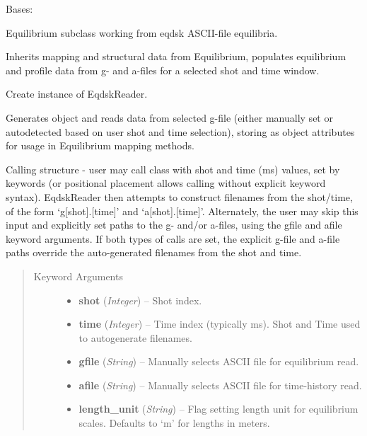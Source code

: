 \documentclass[letterpaper,10pt,english]{sphinxmanual}
\begin{document}
\begin{fulllineitems}
\label{eqtools:eqtools.eqdskreader.EqdskReader}
Bases: {\hyperref[eqtools:eqtools.core.Equilibrium]{}}

Equilibrium subclass working from eqdsk ASCII-file equilibria.

Inherits mapping and structural data from Equilibrium, populates equilibrium
and profile data from g- and a-files for a selected shot and time window.

Create instance of EqdskReader.

Generates object and reads data from selected g-file (either manually set or
autodetected based on user shot and time selection), storing as object
attributes for usage in Equilibrium mapping methods.

Calling structure - user may call class with shot and time (ms) values, set
by keywords (or positional placement allows calling without explicit keyword
syntax).  EqdskReader then attempts to construct filenames from the
shot/time, of the form `g{[}shot{]}.{[}time{]}' and `a{[}shot{]}.{[}time{]}'.  Alternately,
the user may skip this input and explicitly set paths to the g- and/or
a-files, using the gfile and afile keyword arguments.  If both types of
calls are set, the explicit g-file and a-file paths override the
auto-generated filenames from the shot and time.
\begin{quote}\begin{description}
\item[{Keyword Arguments}] \leavevmode\begin{itemize}
\item {} 
\textbf{shot} (\emph{Integer}) --
Shot index.

\item {} 
\textbf{time} (\emph{Integer}) --
Time index (typically ms).  Shot and Time used to
autogenerate filenames.

\item {} 
\textbf{gfile} (\emph{String}) --
Manually selects ASCII file for equilibrium read.

\item {} 
\textbf{afile} (\emph{String}) --
Manually selects ASCII file for time-history read.

\item {} 
\textbf{length\_unit} (\emph{String}) --
Flag setting length unit for equilibrium scales.
Defaults to `m' for lengths in meters.


\end{itemize}
\end{description}
\end{quote}
\end{fulllineitems}
\end{document}

